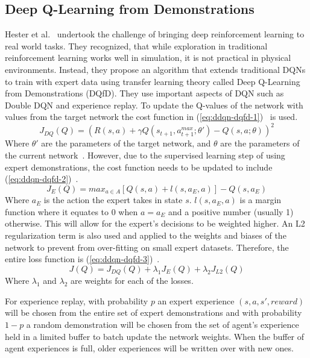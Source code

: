 \documentclass[12pt,american]{report}
\begin{document}
\subsection{Deep Q-Learning from Demonstrations}
Hester et al.~\cite{hester2017learning} undertook the challenge of bringing deep reinforcement learning to real world tasks.  They recognized, that while exploration in traditional reinforcement learning works well in simulation, it is not practical in physical environments.  Instead, they propose an algorithm that extends traditional DQNs to train with expert data using transfer learning theory called Deep Q-Learning from Demonstrations (DQfD).  They use important aspects of DQN such as Double DQN and experience replay.  To update the Q-values of the network with values from the target network the cost function in (\ref{eq:ddqn-dqfd-1})~\cite{hester2017learning} is used.
\begin{equation}
     \label{eq:ddqn-dqfd-1}
     J_{DQ}(Q) =(R(s,a)+\gamma Q(s_{t+1},a^{max}_{t+1};\theta')-Q(s,a;\theta))^2%
\end{equation}
Where $\theta'$ are the parameters of the target network, and $\theta$ are the parameters of the current network~\cite{van2016deep}.  However, due to the supervised learning step of using expert demonstrations, the cost function needs to be updated to include (\ref{eq:ddqn-dqfd-2})~\cite{hester2017learning}.
\begin{equation}
     \label{eq:ddqn-dqfd-2}
     J_{E}(Q) =max_{a\in A}[Q(s,a)+l(s,a_E,a)]-Q(s,a_E)%
\end{equation}
Where $a_E$ is the action the expert takes in state $s$.  $l(s,a_E,a)$ is a margin function where it equates to 0 when $a=a_E$ and a positive number (usually 1) otherwise.  This will allow for the expert's decisions to be weighted higher.  An L2 regularization term is also used and applied to the weights and biases of the network to prevent from over-fitting on small expert datasets.  Therefore, the entire loss function is (\ref{eq:ddqn-dqfd-3})~\cite{hester2017learning}.
\begin{equation}
     \label{eq:ddqn-dqfd-3}
     J(Q) =J_{DQ}(Q) + \lambda_1J_E(Q) + \lambda_2J_{L2}(Q)%
\end{equation}
Where $\lambda_1$ and $\lambda_2$ are weights for each of the losses. 

For experience replay, with probability $p$ an expert experience $(s,a,s',reward)$ will be chosen from the entire set of expert demonstrations and with probability $1-p$ a random demonstration will be chosen from the set of agent's experience held in a limited buffer to batch update the network weights.  When the buffer of agent experiences is full, older experiences will be written over with new ones.  
\end{document}
